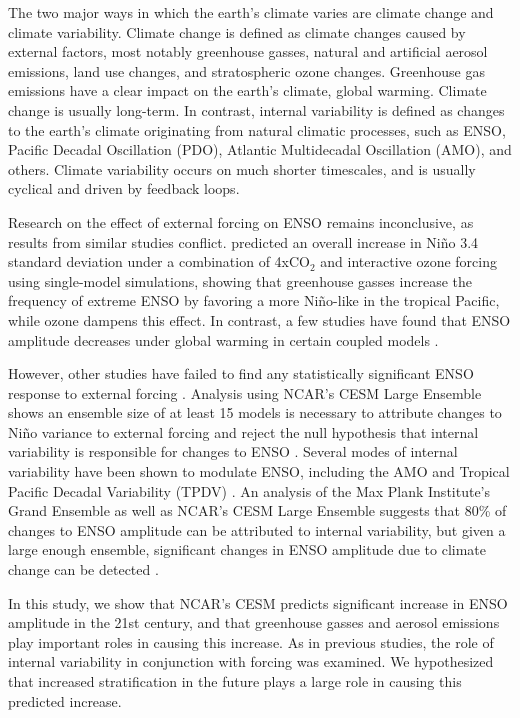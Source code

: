 \documentclass[12pt]{article}
\begin{document}
The two major ways in which the earth's climate varies are climate change and climate variability. Climate change is defined as climate changes caused by external factors, most notably greenhouse gasses, natural and artificial aerosol emissions, land use changes, and stratospheric ozone changes. Greenhouse gas emissions have a clear impact on the earth's climate, global warming. Climate change is usually long-term. In contrast, internal variability is defined as changes to the earth's climate originating from natural climatic processes, such as ENSO, Pacific Decadal Oscillation (PDO), Atlantic Multidecadal Oscillation (AMO), and others. Climate variability occurs on much shorter timescales, and is usually cyclical and driven by feedback loops.

Research on the effect of external forcing on ENSO remains inconclusive, as results from similar studies conflict. \cite{nowack2017role} predicted an overall increase in Niño 3.4 standard deviation under a combination of 4xCO$_2$ and interactive ozone forcing using single-model simulations, showing that greenhouse gasses increase the frequency of extreme ENSO by favoring a more Niño-like in the tropical Pacific, while ozone dampens this effect. In contrast, a few studies have found that ENSO amplitude decreases under global warming in certain coupled models \parencite{kohyama2018weakening}.

However, other studies have failed to find any statistically significant ENSO response to external forcing \parencite{stevenson2012significant}. Analysis using NCAR's CESM Large Ensemble shows an ensemble size of at least 15 models is necessary to attribute changes to Niño variance to external forcing and reject the null hypothesis that internal variability is responsible for changes to ENSO \parencite{zheng2018response}. Several modes of internal variability have been shown to modulate ENSO, including the AMO \parencite{levine2017impact} and Tropical Pacific Decadal Variability (TPDV) \parencite{zheng2018response}. An analysis of the Max Plank Institute's Grand Ensemble as well as NCAR's CESM Large Ensemble suggests that 80\% of changes to ENSO amplitude can be attributed to internal variability, but given a large enough ensemble, significant changes in ENSO amplitude due to climate change can be detected \parencite{maher2018enso}.

In this study, we show that NCAR's CESM predicts significant increase in ENSO amplitude in the 21st century, and that greenhouse gasses and aerosol emissions play important roles in causing this increase. As in previous studies, the role of internal variability in conjunction with forcing was examined. We hypothesized that increased stratification in the future plays a large role in causing this predicted increase.
\end{document}
